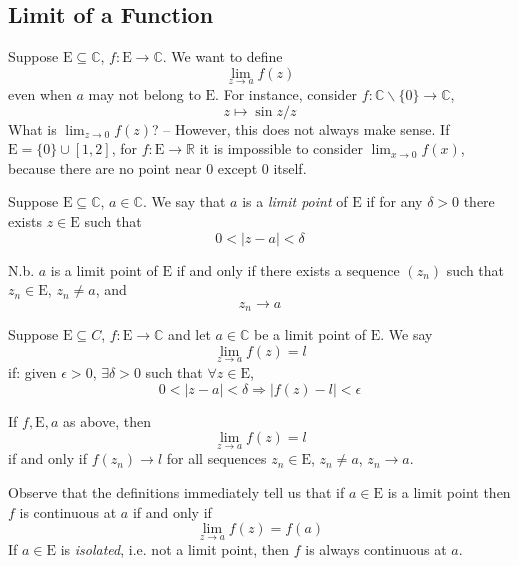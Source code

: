 \documentclass[10pt, a4paper, twoside]{report}
\begin{document}
\subsection{Limit of a Function}
Suppose \(\mathrm{E}\subseteq\mathbb{C}\), \(f:\mathrm{E}\to\mathbb{C}\). We want to define 
\[\lim_{z\to a}f(z)\]
even when \(a\) may not belong to \(\mathrm{E}\). For instance, consider \(f:\mathbb{C}\backslash\{0\}\to\mathbb{C}\),
\[z\mapsto{\sin z}/{z}\] What is \(\lim_{z\to 0}f(z)\)? -- However, this does not always make sense. If \(\mathrm{E}=\{0\}\cup[1,2]\), for \(f:\mathrm{E}\to\mathbb{R}\) it is impossible to consider \(\lim_{x\to 0}f(x)\), because there are no point near \(0\) except \(0\) itself. 
\begin{definition}
    Suppose \(\mathrm{E}\subseteq\mathbb{C}\), \(a\in\mathbb{C}\). We say that \(a\) is a \emph{limit point} of \(\mathrm{E}\) if for any \(\delta>0\) there exists \(z\in\mathrm{E}\) such that
    \[0<|z-a|<\delta\]
    \label{def:limit_point}
\end{definition}
N.b. \(a\) is a limit point of \(\mathrm{E}\) if and only if there exists a sequence \((z_n)\) such that \(z_n\in\mathrm{E}\), \(z_n\neq a\), and 
\[z_n\to a\]
\begin{definition}
    Suppose \(\mathrm{E}\subseteq C\), \(f:\mathrm{E}\to\mathbb{C}\) and let \(a\in\mathbb{C}\) be a limit point of \(\mathrm{E}\). We say 
    \[\lim_{z\to a}f(z)=l\]
    if: given \(\epsilon>0\), \(\exists\delta>0\) such that \(\forall z\in\mathrm{E}\),
    \[0<|z-a|<\delta\Rightarrow|f(z)-l|<\epsilon\]
    \label{def:limit_ed}
\end{definition}
\begin{lemma}
    If \(f,\mathrm{E},a\) as above, then 
    \[\lim_{z\to a}f(z)=l\]
    if and only if \(f(z_n)\to l\) for all sequences \(z_n\in\mathrm{E}\), \(z_n\neq a\), \(z_n\to a\).
\end{lemma}
Observe that the definitions immediately tell us that if \(a\in\mathrm{E}\) is a limit point then \(f\) is continuous at \(a\) if and only if 
\[\lim_{z\to a}f(z)=f(a)\]
If \(a\in\mathrm{E}\) is \emph{isolated}, i.e. not a limit point, then \(f\) is always continuous at \(a\). 
\end{document}
